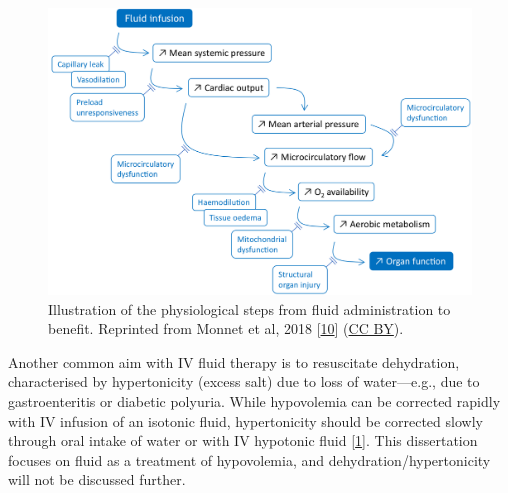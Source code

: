 \documentclass[a4paper, nobind]{templates/ociamthesis}
\begin{document}
\begin{figure}

{\centering \includegraphics[width=14cm]{figures/background-monnet2018-aic-fluid2organ} 

}

\caption[Steps from fluid administration to benefit]{Illustration of the physiological steps from fluid administration to benefit. Reprinted from Monnet et al, 2018 {[}\protect\hyperlink{ref-monnetMyPatientHas2018}{10}{]} (\href{https://creativecommons.org/licenses/by/4.0/}{CC BY}).}\label{fig:background-monnet2018-aic-fluid2organ}
\end{figure}



Another common aim with IV fluid therapy is to resuscitate dehydration, characterised by hypertonicity (excess salt) due to loss of water---e.g., due to gastroenteritis or diabetic polyuria. While hypovolemia can be corrected rapidly with IV infusion of an isotonic fluid, hypertonicity should be corrected slowly through oral intake of water or with IV hypotonic fluid {[}\protect\hyperlink{ref-bhaveVolumeDepletionDehydration2011}{1}{]}. This dissertation focuses on fluid as a treatment of hypovolemia, and dehydration/hypertonicity will not be discussed further.
\end{document}
